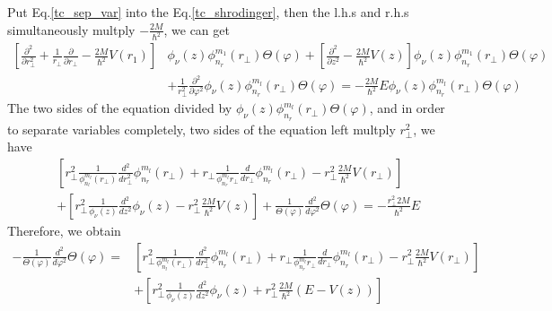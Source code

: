 Put Eq.\eqref{tc_sep_var} into the Eq.\eqref{tc_shrodinger}, then the l.h.s and r.h.s simultaneously multply $-\frac{2M}{\hbar^2}$, we can get
\begin{equation}
\begin{aligned}
    \left[ \frac{\partial^{2}}{\partial r_{\perp}^{2}}+\frac{1}{r_{\perp}} \frac{\partial}{\partial r_{\perp}}-\frac{2 M}{\hbar^{2}}  V(r_{1}) \right] &\phi_{\nu}(z) \phi_{n_{r}}^{m_{1}}(r_{\perp})\Theta(\varphi) +\left[\frac{\partial^{2}}{\partial z^{2}}-\frac{2 M}{\hbar^{2}} V(z)\right] \phi_{\nu}(z) \phi_{n_{r}}^{m_{1}}(r_{\perp})\Theta(\varphi)\\
    &+\frac{1}{r_{\perp}^{2}} \frac{\partial^{2}}{\partial \varphi^{2}} \phi_{\nu}(z) \phi_{n_{r}}^{m_{l}}\left(r_{\perp}\right)\Theta(\varphi)=-\frac{2 M}{\hbar^{2}} E \phi_{\nu}(z) \phi_{n_{r}}^{m_{l}}\left(r_{\perp}\right)\Theta(\varphi)
\end{aligned}
\end{equation}
The two sides of the equation divided by $\phi_{\nu}(z) \phi_{n_{r}}^{m_{l}}\left(r_{\perp}\right)\Theta(\varphi)$, and in order to separate variables completely, two sides of the equation left multply $r_\perp^2$, we have
\begin{equation}
\begin{aligned}
  &\left[r_{\perp}^{2} \frac{1}{\phi_{n_{l}}^{m_l}\left(r_{\perp}\right)} \frac{d^{2}}{d r_{\perp}^{2}} \phi_{n_{r}}^{m_l}\left(r_{\perp}\right)+r_{\perp} \frac{1}{\phi_{n_{r}}^{m_{l}} r_{\perp}} \frac{d}{d r_{\perp}} \phi_{n_{r}}^{m_{l}}\left(r_{\perp}\right)-r_{\perp}^{2} \frac{2 M}{\hbar^{2}} V\left(r_{\perp}\right)\right]\\
  &+\left[r_{\perp}^{2} \frac{1}{\phi_{\nu}(z)} \frac{d^{2}}{d z^{2}} \phi_{\nu}(z)-r_{\perp}^{2} \frac{2 M}{\hbar^{2}} V(z)\right]+\frac{1}{\Theta(\varphi)} \frac{d^{2}}{d \varphi^{2}}\Theta(\varphi)=-\frac{r_{\perp}^{2} 2 M}{\hbar^{2}} E
\end{aligned}
\end{equation}
Therefore, we obtain
\begin{equation}
\begin{aligned}
  -\frac{1}{\Theta(\varphi)} \frac{d^{2}}{d \varphi^{2}}\Theta(\varphi) = 
  &\left[r_{\perp}^{2} \frac{1}{\phi_{n_{l}}^{m_l}\left(r_{\perp}\right)} \frac{d^{2}}{d r_{\perp}^{2}} \phi_{n_{r}}^{m_l}\left(r_{\perp}\right)+r_{\perp} \frac{1}{\phi_{n_{r}}^{m_{l}} r_{\perp}} \frac{d}{d r_{\perp}} \phi_{n_{r}}^{m_{l}}\left(r_{\perp}\right)-r_{\perp}^{2} \frac{2 M}{\hbar^{2}} V\left(r_{\perp}\right)\right]\\
  &+\left[r_{\perp}^{2} \frac{1}{\phi_{\nu}(z)} \frac{d^{2}}{d z^{2}} \phi_{\nu}(z) + r_{\perp}^{2} \frac{2 M}{\hbar^{2}}\left( E - V(z)\right)\right]  \label{tc_sep_first}
\end{aligned}
\end{equation}
